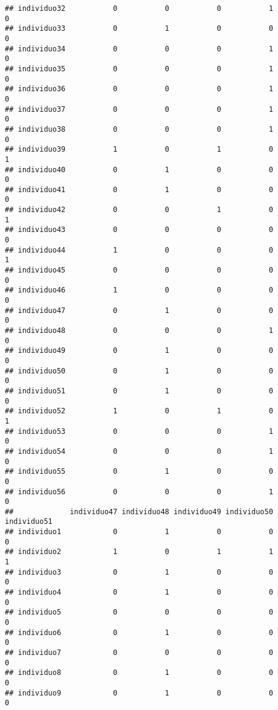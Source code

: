 \documentclass[
]{article}
\begin{document}
\begin{verbatim}
## individuo32           0           0           0           1           0
## individuo33           0           1           0           0           0
## individuo34           0           0           0           1           0
## individuo35           0           0           0           1           0
## individuo36           0           0           0           1           0
## individuo37           0           0           0           1           0
## individuo38           0           0           0           1           0
## individuo39           1           0           1           0           1
## individuo40           0           1           0           0           0
## individuo41           0           1           0           0           0
## individuo42           0           0           1           0           1
## individuo43           0           0           0           0           0
## individuo44           1           0           0           0           1
## individuo45           0           0           0           0           0
## individuo46           1           0           0           0           0
## individuo47           0           1           0           0           0
## individuo48           0           0           0           1           0
## individuo49           0           1           0           0           0
## individuo50           0           1           0           0           0
## individuo51           0           1           0           0           0
## individuo52           1           0           1           0           1
## individuo53           0           0           0           1           0
## individuo54           0           0           0           1           0
## individuo55           0           1           0           0           0
## individuo56           0           0           0           1           0
##             individuo47 individuo48 individuo49 individuo50 individuo51
## individuo1            0           1           0           0           0
## individuo2            1           0           1           1           1
## individuo3            0           1           0           0           0
## individuo4            0           1           0           0           0
## individuo5            0           0           0           0           0
## individuo6            0           1           0           0           0
## individuo7            0           0           0           0           0
## individuo8            0           1           0           0           0
## individuo9            0           1           0           0           0

\end{verbatim}
\end{document}
